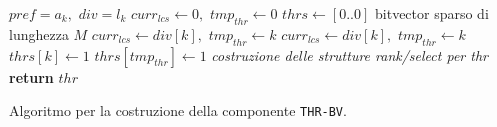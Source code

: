 \begin{algorithm}
  \begin{algorithmic}
    \Comment $pref=a_k,\,\,div=l_k$
    \State $curr_{lcs}\gets 0,\,\,tmp_{thr}\gets 0$
    \State $thrs\gets[0..0]$
    \Comment bitvector sparso di lunghezza $M$
    \For {\textit{every} $k\in\left[0,\,\, M\right)$}
    \State $curr_{lcs}\gets div[k],\,\,tmp_{thr}\gets k$
    \EndIf
    \State $curr_{lcs}\gets div[k],\,\,tmp_{thr}\gets k$
    \EndIf
    \State $thrs[k]\gets 1$
    \Else
    \State $thrs[tmp_{thr}]\gets 1$
    \EndIf
    \EndIf
    \EndFor
    \State \textit{costruzione delle strutture rank/select per thr}
    \State \textbf{return} $thr$  
    \EndFunction
  \end{algorithmic}
  \caption{Algoritmo per la costruzione della componente \texttt{THR-BV}.}
  \label{algo:thrbv}
\end{algorithm}
